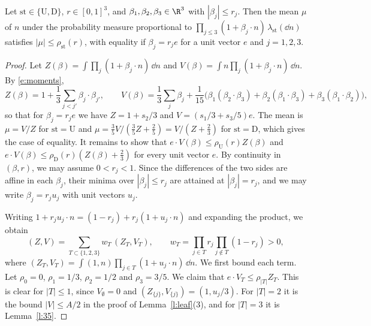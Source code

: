 \begin{lemma}\label{l:radius}
Let $\mathrm{st} \in \{\mathrm U, \mathrm D\}$, $r \in [0, 1]^3$, and $\beta_1, \beta_2, \beta_3 \in \R^3$ with $|\beta_j| \le r_j$. Then the mean $\mu$ of $n$ under the probability measure proportional to $\prod_{j \le 3} (1 + \beta_j \cdot n) \, \lambda_{\mathrm{st}}(\dd n)$ satisfies $|\mu| \le \rho_{\mathrm{st}}(r)$, with equality if $\beta_j = r_j e$ for a unit vector $e$ and $j = 1, 2, 3$.
\end{lemma}

\begin{proof}
Let $Z(\beta) = \int \prod_j (1 + \beta_j \cdot n) \, \dd n$ and $V(\beta) = \int n \prod_j (1 + \beta_j \cdot n) \, \dd n$. By \eqref{e:moments},
\begin{equation}\label{e:ZVbeta}
Z(\beta) = 1 + \frac13 \sum_{j < j'} \beta_j \cdot \beta_{j'}, \qquad V(\beta) = \frac13 \sum_j \beta_j + \frac1{15} \bigl( \beta_1 (\beta_2 \cdot \beta_3) + \beta_2 (\beta_1 \cdot \beta_3) + \beta_3 (\beta_1 \cdot \beta_2) \bigr),
\end{equation}
so that for $\beta_j = r_j e$ we have $Z = 1 + s_2/3$ and $V = (s_1/3 + s_3/5) e$. The mean is $\mu = V/Z$ for $\mathrm{st} = \mathrm U$ and $\mu = \frac35 V / (\frac35 Z + \frac25) = V / (Z + \frac23)$ for $\mathrm{st} = \mathrm D$, which gives the case of equality. It remains to show that $e \cdot V(\beta) \le \rho_{\mathrm U}(r) Z(\beta)$ and $e \cdot V(\beta) \le \rho_{\mathrm D}(r) (Z(\beta) + \frac23)$ for every unit vector $e$. By continuity in $(\beta, r)$, we may assume $0 < r_j < 1$. Since the differences of the two sides are affine in each $\beta_j$, their minima over $|\beta_j| \le r_j$ are attained at $|\beta_j| = r_j$, and we may write $\beta_j = r_j u_j$ with unit vectors $u_j$.

Writing $1 + r_j u_j \cdot n = (1 - r_j) + r_j (1 + u_j \cdot n)$ and expanding the product, we obtain
\begin{equation}\label{e:subsets}
(Z, V) = \sum_{T \subset \{1, 2, 3\}} w_T \, (Z_T, V_T), \qquad w_T = \prod_{j \in T} r_j \prod_{j \notin T} (1 - r_j) > 0 ,
\end{equation}
where $(Z_T, V_T) = \int (1, n) \prod_{j \in T} (1 + u_j \cdot n) \, \dd n$. We first bound each term. Let $\rho_0 = 0$, $\rho_1 = 1/3$, $\rho_2 = 1/2$ and $\rho_3 = 3/5$. We claim that $e \cdot V_T \le \rho_{|T|} Z_T$. This is clear for $|T| \le 1$, since $V_\emptyset = 0$ and $(Z_{\{j\}}, V_{\{j\}}) = (1, u_j/3)$. For $|T| = 2$ it is the bound $|V| \le A/2$ in the proof of Lemma~\ref{l:leaf}(3), and for $|T| = 3$ it is Lemma~\ref{l:35}.


\end{proof}
